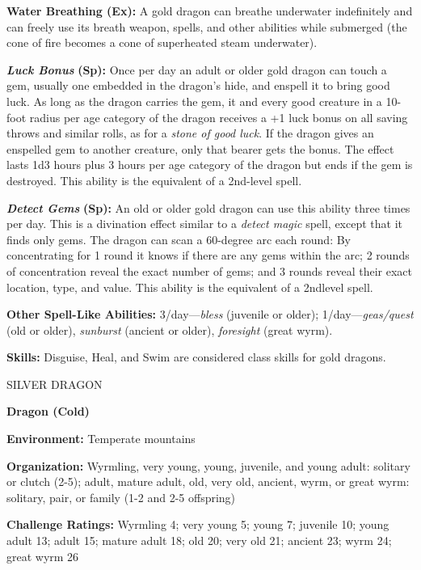 \documentclass{article}
\begin{document}
{\textbf{Water Breathing (Ex):} A gold dragon can breathe underwater indefinitely 
and can freely use its breath weapon, spells, and other abilities while submerged 
(the cone of fire becomes a cone of superheated steam underwater).

\textit{\textbf{Luck Bonus }}\textbf{(Sp):} Once per day an adult or older gold 
dragon can touch a gem, usually one embedded in the dragon's hide, and enspell 
it to bring good luck. As long as the dragon carries the gem, it and every good 
creature in a 10-foot radius per age category of the dragon receives a +1 luck 
bonus on all saving throws and similar rolls, as for a \textit{stone of good luck}. 
If the dragon gives an enspelled gem to another creature, only that bearer gets 
the bonus. The effect lasts 1d3 hours plus 3 hours per age category of the dragon 
but ends if the gem is destroyed. This ability is the equivalent of a 2nd-level 
spell.

\textit{\textbf{Detect Gems }}\textbf{(Sp):} An old or older gold dragon can use 
this ability three times per day. This is a divination effect similar to a \textit{detect 
magic }spell, except that it finds only gems. The dragon can scan a 60-degree arc 
each round: By concentrating for 1 round it knows if there are any gems within 
the arc; 2 rounds of concentration reveal the exact number of gems; and 3 rounds 
reveal their exact location, type, and value. This ability is the equivalent of 
a 2ndlevel spell.

\textbf{Other Spell-Like Abilities:} 3/day---\textit{bless }(juvenile or older); 
1/day---\textit{geas/quest }(old or older), \textit{sunburst }(ancient or older), 
\textit{foresight }(great wyrm).

\textbf{Skills: }Disguise, Heal, and Swim are considered class skills for gold 
dragons.

\vspace{12pt}
SILVER DRAGON

\textbf{Dragon (Cold)}

\textbf{Environment:} Temperate mountains

\textbf{Organization:} Wyrmling, very young, young, juvenile, and young adult: 
solitary or clutch (2-5); adult, mature adult, old, very old, ancient, wyrm, or 
great wyrm: solitary, pair, or family (1-2 and 2-5 offspring)

\textbf{Challenge Ratings:} Wyrmling 4; very young 5; young 7; juvenile 10; young 
adult 13; adult 15; mature adult 18; old 20; very old 21; ancient 23; wyrm 24; 
great wyrm 26

}
\end{document}

